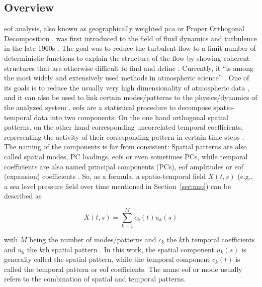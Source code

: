 \subsection{Overview}

\acf{eof} analysis, also known as geographically weighted \ac{pca} or Proper Orthogonal Decomposition \cite{vietinghoffdiss}, was first introduced to the field of fluid dynamics and turbulence in the late 1960s \cite{weiss_tutorial_2019}. The goal was to reduce the turbulent flow to a limit number of deterministic functions to explain the structure of the flow by showing coherent structures that are otherwise difficult to find and define \cite{weiss_tutorial_2019}. Currently, it \enquote{is among the most widely and extensively used methods in atmospheric science} \cite{hannachi_empirical_2007}. 
One of its goals is to reduce the usually very high dimensionality of atmospheric data \cite{hannachi_empirical_2007}, and it can also be used to link certain modes/patterns to the physics/dynamics of the analyzed system \cite{dommenget_cautionary_2002}.  
\acp{eof} are a statistical procedure to decompose spatio-temporal data into two components: On the one hand orthogonal spatial patterns, on the other hand corresponding uncorrelated temporal coefficients, representing the activity of their corresponding pattern in certain time steps \cite{hannachi_empirical_2007, vietinghoffdiss}. 
The naming of the components is far from consistent: Spatial patterns are also called spatial modes, PC loadings, \acp{eof} or even sometimes PCs, while temporal coefficients are also named principal components (PCs), \ac{eof} amplitudes or \ac{eof} (expansion) coefficients \cite{hannachi_empirical_2007}. 
So, as a formula, a spatio-temporal field $X(t, s)$ (e.g., a sea level pressure field over time mentioned in Section~\ref{sec:nao}) can be described as

\begin{equation}
  X(t, s) = \sum^{M}_{k=1} c_k(t) u_k(s)
  \label{eq:eof decomposition}
\end{equation}

with $M$ being the number of modes/patterns and  $c_k$ the $k$th temporal coefficients and $u_k$ the $k$th spatial pattern \cite{hannachi_empirical_2007}. 
In this work, the spatial component $u_k(s)$ is generally called the spatial pattern, while the temporal component $c_k(t)$ is called the temporal pattern or \ac{eof} coefficients.
The name \ac{eof} or mode usually refers to the combination of spatial and temporal patterns. 

